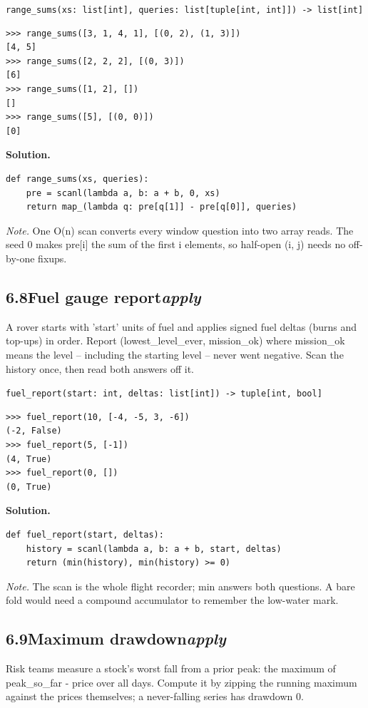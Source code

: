 \documentclass[10pt,letterpaper]{book}
\begin{document}
\noindent\texttt{range\_sums(xs: list[int], queries: list[tuple[int, int]]) -> list[int]}
\begin{lstlisting}[style=ex]
>>> range_sums([3, 1, 4, 1], [(0, 2), (1, 3)])
[4, 5]
>>> range_sums([2, 2, 2], [(0, 3)])
[6]
>>> range_sums([1, 2], [])
[]
>>> range_sums([5], [(0, 0)])
[0]
\end{lstlisting}
\noindent\textbf{Solution.}
\begin{lstlisting}[style=code]
def range_sums(xs, queries):
    pre = scanl(lambda a, b: a + b, 0, xs)
    return map_(lambda q: pre[q[1]] - pre[q[0]], queries)
\end{lstlisting}
\noindent\textit{Note.} One O(n) scan converts every window question into two array reads. The seed 0 makes pre[i] the sum of the first i elements, so half-open (i, j) needs no off-by-one fixups.

\subsection*{6.8\quad Fuel gauge report\hfill\textnormal{\textit{apply}}}
A rover starts with 'start' units of fuel and applies signed fuel deltas (burns and top-ups) in order. Report (lowest\_level\_ever, mission\_ok) where mission\_ok means the level -- including the starting level -- never went negative. Scan the history once, then read both answers off it.

\noindent\texttt{fuel\_report(start: int, deltas: list[int]) -> tuple[int, bool]}
\begin{lstlisting}[style=ex]
>>> fuel_report(10, [-4, -5, 3, -6])
(-2, False)
>>> fuel_report(5, [-1])
(4, True)
>>> fuel_report(0, [])
(0, True)
\end{lstlisting}
\noindent\textbf{Solution.}
\begin{lstlisting}[style=code]
def fuel_report(start, deltas):
    history = scanl(lambda a, b: a + b, start, deltas)
    return (min(history), min(history) >= 0)
\end{lstlisting}
\noindent\textit{Note.} The scan is the whole flight recorder; min answers both questions. A bare fold would need a compound accumulator to remember the low-water mark.

\subsection*{6.9\quad Maximum drawdown\hfill\textnormal{\textit{apply}}}
Risk teams measure a stock's worst fall from a prior peak: the maximum of peak\_so\_far - price over all days. Compute it by zipping the running maximum against the prices themselves; a never-falling series has drawdown 0.
\end{document}
